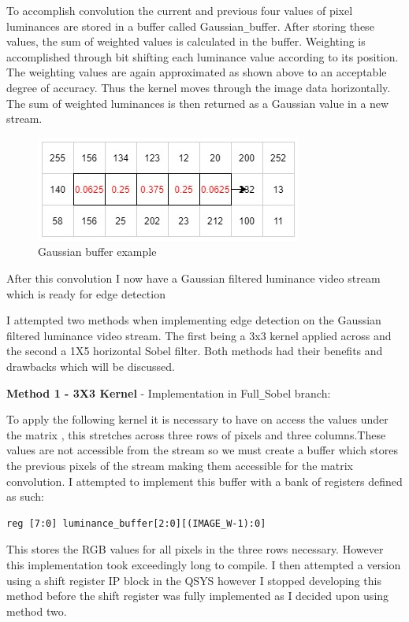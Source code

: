 \documentclass[10pt,twoside]{article}
\begin{document}
To accomplish convolution the current and previous four values of pixel luminances are stored in a buffer called Gaussian\verb|_|buffer. After storing these values, the sum of weighted values is calculated in the buffer. Weighting is accomplished through bit shifting each luminance value according to its position. The weighting values are again approximated as shown above to an acceptable degree of accuracy. Thus the kernel moves through the image data horizontally. The sum of weighted luminances is then returned as a Gaussian value in a new stream.

\begin{figure}[hbt]
\includegraphics[scale = 0.55]{GaussianBufferjpg.jpg}
\centering
\caption{Gaussian buffer example}
\label{fig:InitalDesign}
\end{figure}

After this convolution I now have a Gaussian filtered luminance video stream which is ready for edge detection

I attempted two methods when implementing edge detection on the Gaussian filtered luminance video stream. The first being a 3x3 kernel applied across and the second a 1X5 horizontal Sobel filter. Both methods had their benefits and drawbacks which will be discussed. 

\textbf{Method 1 - 3X3 Kernel}  - Implementation in Full\verb|_|Sobel branch:

To apply the following kernel it is necessary to have on access the values under the matrix , this stretches across three rows of pixels and three columns.These values are not accessible from the stream so we must create a buffer which stores the previous pixels of the stream making them accessible for the matrix convolution. I attempted to implement this buffer with a bank of registers defined as such:
\begin{verbatim}
reg [7:0] luminance_buffer[2:0][(IMAGE_W-1):0] 
\end{verbatim}
This stores the RGB values for all pixels in the three rows necessary. However this implementation took exceedingly long to compile. I then attempted a version using a shift register IP block in the QSYS however I stopped developing this method before the shift register was fully implemented as I decided upon using method two.
\end{document}
